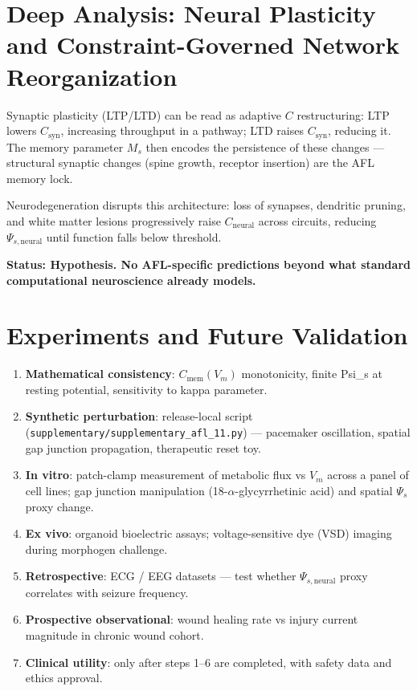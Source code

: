 \documentclass[12pt,a4paper]{article}
\begin{document}
\section{Deep Analysis: Neural Plasticity and Constraint-Governed Network Reorganization}

Synaptic plasticity (LTP/LTD) can be read as adaptive $C$ restructuring: LTP lowers $C_{\mathrm{syn}}$, increasing throughput in a pathway; LTD raises $C_{\mathrm{syn}}$, reducing it. The memory parameter $M_s$ then encodes the persistence of these changes — structural synaptic changes (spine growth, receptor insertion) are the AFL memory lock.

Neurodegeneration disrupts this architecture: loss of synapses, dendritic pruning, and white matter lesions progressively raise $C_{\mathrm{neural}}$ across circuits, reducing $\Psi_{s,\mathrm{neural}}$ until function falls below threshold.

\textbf{Status: Hypothesis. No AFL-specific predictions beyond what standard computational neuroscience already models.}

\section{Experiments and Future Validation}

\begin{enumerate}
    \item \textbf{Mathematical consistency}: $C_{\mathrm{mem}}(V_m)$ monotonicity, finite Psi\_s at resting potential, sensitivity to kappa parameter.
    \item \textbf{Synthetic perturbation}: release-local script (\texttt{supplementary/supplementary\_afl\_11.py}) — pacemaker oscillation, spatial gap junction propagation, therapeutic reset toy.
    \item \textbf{In vitro}: patch-clamp measurement of metabolic flux vs $V_m$ across a panel of cell lines; gap junction manipulation (18-$\alpha$-glycyrrhetinic acid) and spatial $\Psi_s$ proxy change.
    \item \textbf{Ex vivo}: organoid bioelectric assays; voltage-sensitive dye (VSD) imaging during morphogen challenge.
    \item \textbf{Retrospective}: ECG / EEG datasets — test whether $\Psi_{s,\mathrm{neural}}$ proxy correlates with seizure frequency.
    \item \textbf{Prospective observational}: wound healing rate vs injury current magnitude in chronic wound cohort.
    \item \textbf{Clinical utility}: only after steps 1--6 are completed, with safety data and ethics approval.
\end{enumerate}
\end{document}
